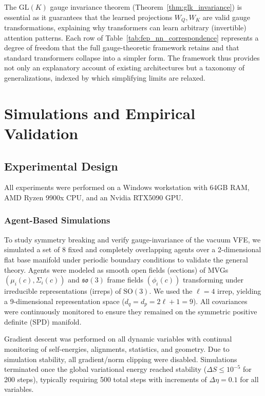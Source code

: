\documentclass[twoside,11pt]{article}
\begin{document}
The $\mathrm{GL}(K)$ gauge invariance theorem (Theorem~\ref{thm:glk_invariance}) is essential as it guarantees that the learned projections $W_Q, W_K$ are valid gauge transformations, explaining why transformers can learn arbitrary (invertible) attention patterns. Each row of Table~\ref{tab:fep_nn_correspondence} represents a degree of freedom that the full gauge-theoretic framework retains and that standard transformers collapse into a simpler form. The framework thus provides not only an explanatory account of existing architectures but a taxonomy of generalizations, indexed by which simplifying limits are relaxed.


\section{Simulations and Empirical Validation}

\subsection{Experimental Design}

All experiments were performed on a Windows workstation with 64GB RAM, AMD Ryzen 9900x CPU, and an Nvidia RTX5090 GPU.

\subsubsection{Agent-Based Simulations}
To study symmetry breaking and verify gauge-invariance of the vacuum VFE, we simulated a set of 8 fixed and completely overlapping agents over a 2-dimensional flat base manifold under periodic boundary conditions to validate the general theory. Agents were modeled as smooth open fields (sections) of MVGs $(\mu_i(c), \Sigma_i(c))$ and $\mathfrak{so}(3)$ frame fields $(\phi_i(c))$ transforming under irreducible representations (irreps) of $\mathrm{SO}(3)$. We used the $\ell = 4$ irrep, yielding a 9-dimensional representation space ($d_q = d_p = 2\ell + 1 = 9$). All covariances were continuously monitored to ensure they remained on the symmetric positive definite (SPD) manifold.

Gradient descent was performed on all dynamic variables with continual monitoring of self-energies, alignments, statistics, and geometry. Due to simulation stability, all gradient/norm clipping were disabled. Simulations terminated once the global variational energy reached stability ($\Delta S \leq 10^{-5}$ for 200 steps), typically requiring 500 total steps with increments of $\Delta \eta = 0.1$ for all variables.
\end{document}

